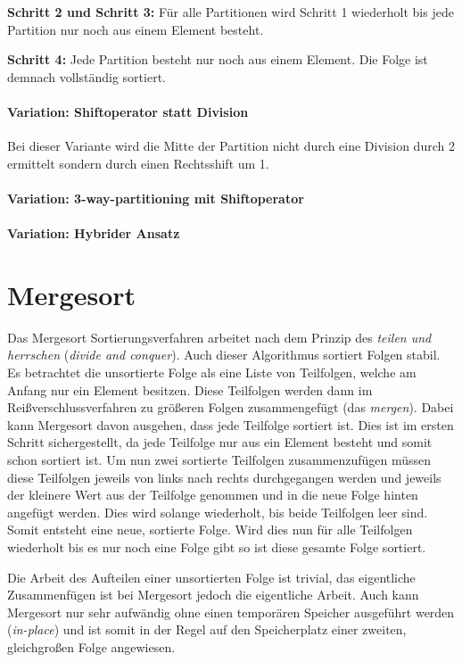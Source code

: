 \documentclass[12pt, a4paper, titlepage, hidelinks]{scrreprt}
\begin{document}
\textbf{Schritt 2 und Schritt 3:} Für alle Partitionen wird Schritt 1 wiederholt bis jede Partition nur noch aus einem Element besteht.

\textbf{Schritt 4:} Jede Partition besteht nur noch aus einem Element. Die Folge ist demnach vollständig sortiert.

\paragraph{Variation: Shiftoperator statt Division} Bei dieser Variante wird die Mitte der Partition nicht durch eine Division durch 2 ermittelt sondern durch einen Rechtsshift um 1.

\paragraph{Variation: 3-way-partitioning mit Shiftoperator}

\paragraph{Variation: Hybrider Ansatz}
\section{Mergesort}
Das Mergesort Sortierungsverfahren arbeitet nach dem Prinzip des \textit{teilen und herrschen} (\textit{divide and conquer}). Auch dieser Algorithmus sortiert Folgen stabil. Es betrachtet die unsortierte Folge als eine Liste von Teilfolgen, welche am Anfang nur ein Element besitzen. Diese Teilfolgen werden dann im Reißverschlussverfahren zu größeren Folgen zusammengefügt (das \textit{mergen}). Dabei kann Mergesort davon ausgehen, dass jede Teilfolge sortiert ist. Dies ist im ersten Schritt sichergestellt, da jede Teilfolge nur aus ein Element besteht und somit schon sortiert ist. Um nun zwei sortierte Teilfolgen zusammenzufügen müssen diese Teilfolgen jeweils von links nach rechts durchgegangen werden und jeweils der kleinere Wert aus der Teilfolge genommen und in die neue Folge hinten angefügt werden. Dies wird solange wiederholt, bis beide Teilfolgen leer sind. Somit entsteht eine neue, sortierte Folge. Wird dies nun für alle Teilfolgen wiederholt bis es nur noch eine Folge gibt so ist diese gesamte Folge sortiert.

Die Arbeit des Aufteilen einer unsortierten Folge ist trivial, das eigentliche Zusammenfügen ist bei Mergesort jedoch die eigentliche Arbeit. Auch kann Mergesort nur sehr aufwändig ohne einen temporären Speicher ausgeführt werden (\textit{in-place}) und ist somit in der Regel auf den Speicherplatz einer zweiten, gleichgroßen Folge angewiesen.
\end{document}
